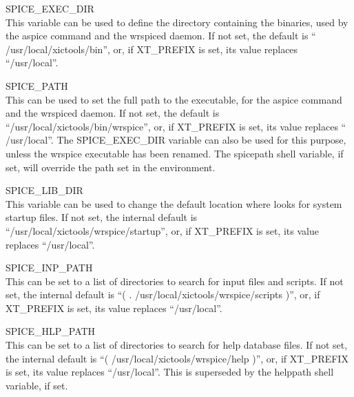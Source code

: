 \begin{description}
\item{\et SPICE\_EXEC\_DIR}\\
This variable can be used to define the directory containing the
{\XicTools} binaries, used by the {\cb aspice} command and the {\vt
wrspiced} daemon.  If not set, the default is ``{\vt
/usr/local/xictools/bin}'', or, if {\vt XT\_PREFIX} is set, its
value replaces ``{\vt /usr/local}''.

\item{\et SPICE\_PATH}\\
This can be used to set the full path to the {\WRspice} executable,
for the {\cb aspice} command and the {\vt wrspiced} daemon.  If not
set, the default is ``{\vt /usr/local/xictools/bin/wrspice}'',
or, if {\et XT\_PREFIX} is set, its value replaces ``{\vt
/usr/local}''.  The {\et SPICE\_EXEC\_DIR} variable can also be used
for this purpose, unless the {\vt wrspice} executable has been
renamed.  The {\et spicepath} shell variable, if set, will override
the path set in the environment.

\item{\et SPICE\_LIB\_DIR}\\
This variable can be used to change the default location where
{\WRspice} looks for system startup files.  If not set, the internal
default is ``{\vt /usr/local/xictools/wrspice/startup}'', or, if
{\vt XT\_PREFIX} is set, its value replaces ``{\vt /usr/local}''.

\item{\et SPICE\_INP\_PATH}\\
This can be set to a list of directories to search for input files and
scripts.  If not set, the internal default is ``{\vt ( . 
/usr/local/xictools/wrspice/scripts )}'', or, if {\et XT\_PREFIX}
is set, its value replaces ``{\vt /usr/local}''.

\item{\et SPICE\_HLP\_PATH}\\
This can be set to a list of directories to search for help database
files.  If not set, the internal default is ``{\vt (
/usr/local/xictools/wrspice/help )}'', or, if {\et XT\_PREFIX} is
set, its value replaces ``{\vt /usr/local}''.  This is superseded by
the {\et helppath} shell variable, if set.


\end{description}
